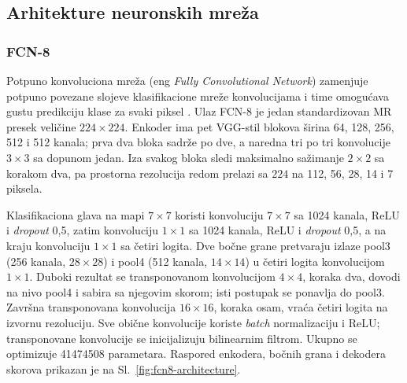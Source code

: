 \documentclass[11pt,a4paper]{article}
\begin{document}
\subsection{Arhitekture neuronskih mreža}
\subsubsection{FCN-8}
Potpuno konvoluciona mreža (eng \textit{Fully Convolutional Network}) zamenjuje potpuno povezane
slojeve klasifikacione mreže konvolucijama i time omogućava gustu predikciju klase za svaki piksel
\cite{long2015}. Ulaz FCN-8 je jedan standardizovan MR presek veličine $224\times224$. Enkoder ima
pet VGG-stil blokova širina 64, 128, 256, 512 i 512 kanala; prva dva bloka sadrže po dve, a naredna
tri po tri konvolucije $3\times3$ sa dopunom jedan. Iza svakog bloka sledi maksimalno sažimanje
$2\times2$ sa korakom dva, pa prostorna rezolucija redom prelazi sa $224$ na 112, 56, 28, 14 i 7
piksela.

Klasifikaciona glava na mapi $7\times7$ koristi konvoluciju $7\times7$ sa 1024 kanala, ReLU i
\textit{dropout} 0,5, zatim konvoluciju $1\times1$ sa 1024 kanala, ReLU i \textit{dropout} 0,5, a na kraju
konvoluciju $1\times1$ sa četiri logita. Dve bočne grane pretvaraju izlaze pool3 (256 kanala,
$28\times28$) i pool4 (512 kanala, $14\times14$) u četiri logita konvolucijom $1\times1$. Duboki
rezultat se transponovanom konvolucijom $4\times4$, koraka dva, dovodi na nivo pool4 i sabira sa
njegovim skorom; isti postupak se ponavlja do pool3. Završna transponovana konvolucija
$16\times16$, koraka osam, vraća četiri logita na izvornu rezoluciju. Sve obične konvolucije
koriste \textit{batch} normalizaciju i ReLU; transponovane konvolucije se inicijalizuju bilinearnim
filtrom. Ukupno se optimizuje \num{41474508} parametara.
Raspored enkodera, bočnih grana i dekodera skorova prikazan je na Sl.~\ref{fig:fcn8-architecture}.
\end{document}
